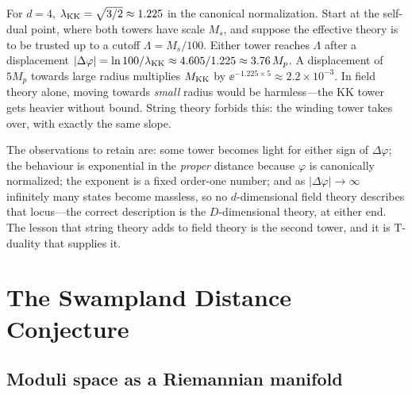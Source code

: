 \begin{example}\label{ex:swampland:numbers}
For $d=4$, $\lambda_{\rm KK}=\sqrt{3/2}\approx1.225$ in the canonical normalization. Start at the
self-dual point, where both towers have scale $M_s$, and suppose the effective theory is to be
trusted up to a cutoff $\Lambda=M_s/100$. Either tower reaches $\Lambda$ after a displacement
$|\Delta\varphi|=\ln100/\lambda_{\rm KK}\approx4.605/1.225\approx3.76\,M_p$. A displacement of
$5M_p$ towards large radius multiplies $M_{\rm KK}$ by $\ee^{-1.225\times5}\approx2.2\times10^{-3}$.
In field theory alone, moving towards \emph{small} radius would be harmless---the KK tower gets
heavier without bound. String theory forbids this: the winding tower takes over, with exactly the
same slope.
\end{example}

The observations to retain  are: some tower becomes light for
either sign of $\Delta\varphi$; the behaviour is exponential in the \emph{proper} distance because
$\varphi$ is canonically normalized; the exponent is a fixed order-one number; and as
$|\Delta\varphi|\to\infty$ infinitely many states become massless, so no $d$-dimensional field theory
describes that locus---the correct description is the $D$-dimensional theory, at either end. The
lesson that string theory adds to field theory is the second tower, and it is T-duality that
supplies it.

\section{The Swampland Distance Conjecture}\label{sec:swampland:sdc}

\subsection{Moduli space as a Riemannian manifold}

